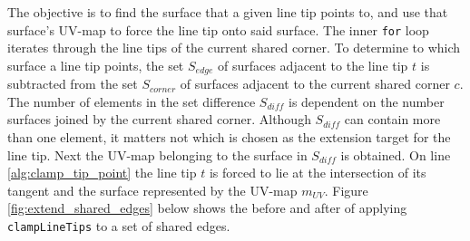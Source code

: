 The objective is to find the surface that a given line tip points to, and use that surface's UV-map to force the line tip onto said surface.
The inner \verb|for| loop iterates through the line tips of the current shared corner.
To determine to which surface a line tip points, the set $S_{edge}$ of surfaces adjacent to the line tip $t$ is subtracted from the set $S_{corner}$ of surfaces adjacent to the current shared corner $c$.
The number of elements in the set difference $S_{diff}$ is dependent on the number surfaces joined by the current shared corner.
Although $S_{diff}$ can contain more than one element, it matters not which is chosen as the extension target for the line tip.
Next the UV-map belonging to the surface in $S_{diff}$ is obtained.
On line \ref{alg:clamp_tip_point} the line tip $t$ is forced to lie at the intersection of its tangent and the surface represented by the UV-map $m_{UV}$.
Figure \ref{fig:extend_shared_edges} below shows the before and after of applying \verb|clampLineTips| to a set of shared edges.

